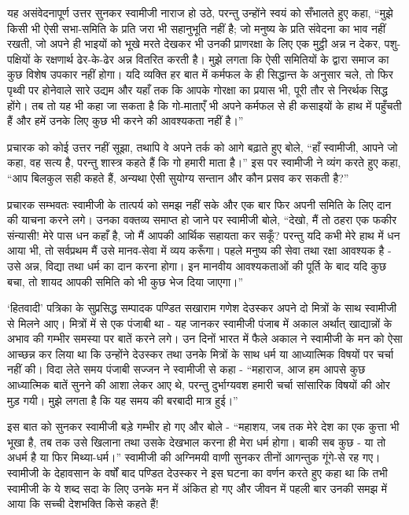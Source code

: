 यह असंवेदनापूर्ण उत्तर सुनकर स्वामीजी नाराज हो उठे, परन्तु उन्होंने स्वयं को सँभालते हुए कहा, “मुझे किसी भी ऐसी सभा-समिति के प्रति जरा भी सहानुभूति नहीं है; जो मनुष्य के प्रति संवेदना का भाव नहीं रखती, जो अपने ही भाइयों को भूखे मरते देखकर भी उनकी प्राणरक्षा के लिए एक मुट्ठी अन्न न देकर, पशु-पक्षियों के रक्षणार्थ ढेर-के-ढेर अन्न वितरित करती है। मुझे लगता कि ऐसी समितियों के द्वारा समाज का कुछ विशेष उपकार नहीं होगा। यदि व्यक्ति हर बात में कर्मफल के ही सिद्धान्त के अनुसार चले, तो फिर पृथ्वी पर होनेवाले सारे उद्यम और यहाँ तक कि आपके गोरक्षा का प्रयास भी, पूरी तौर से निरर्थक सिद्ध होंगे। तब तो यह भी कहा जा सकता है कि गो-माताएँ भी अपने कर्मफल से ही कसाइयों के हाथ में पहुँचती हैं और हमें उनके लिए कुछ भी करने की आवश्यकता नहीं है।” 

प्रचारक को कोई उत्तर नहीं सूझा, तथापि वे अपने तर्क को आगे बढ़ाते हुए बोले, “हाँ स्वामीजी, आपने जो कहा, वह सत्य है, परन्तु शास्त्र कहते हैं कि गो हमारी माता है।” इस पर स्वामीजी ने व्यंग करते हुए कहा, “आप बिलकुल सही कहते हैं, अन्यथा ऐसी सुयोग्य सन्तान और कौन प्रसव कर सकती है?” 

प्रचारक सम्भवतः स्वामीजी के तात्पर्य को समझ नहीं सके और एक बार फिर अपनी समिति के लिए दान की याचना करने लगे। उनका वक्तव्य समाप्त हो जाने पर स्वामीजी बोले, “देखो, मैं तो ठहरा एक फकीर संन्यासी! मेरे पास धन कहाँ है, जो मैं आपकी आर्थिक सहायता कर सकूँ? परन्तु यदि कभी मेरे हाथ में धन आया भी, तो सर्वप्रथम मैं उसे मानव-सेवा में व्यय करूँगा। पहले मनुष्य की सेवा तथा रक्षा आवश्यक है - उसे अन्न, विद्या तथा धर्म का दान करना होगा। इन मानवीय आवश्यकताओं की पूर्ति के बाद यदि कुछ बचा, तो शायद आपकी समिति को भी कुछ भेज दिया जाएगा।” 

\vskip -7pt

\delimiter

‘हितवादी’ पत्रिका के सुप्रसिद्ध सम्पादक पण्डित सखाराम गणेश देउस्कर अपने दो मित्रों के साथ स्वामीजी से मिलने आए। मित्रों में से एक पंजाबी था - यह जानकर स्वामीजी पंजाब में अकाल अर्थात् खाद्यान्नों के अभाव की गम्भीर समस्या पर बातें करने लगे। उन दिनों भारत में फैले अकाल ने स्वामीजी के मन को ऐसा आच्छन्न कर लिया था कि उन्होंने देउस्कर तथा उनके मित्रों के साथ धर्म या आध्यात्मिक विषयों पर चर्चा नहीं की। विदा लेते समय पंजाबी सज्जन ने स्वामीजी से कहा - “महाराज, आज हम आपसे कुछ आध्यात्मिक बातें सुनने की आशा लेकर आए थे, परन्तु दुर्भाग्यवश हमारी चर्चा सांसारिक विषयों की ओर मुड़ गयी। मुझे लगता है कि यह समय की बरबादी मात्र हुई।” 

इस बात को सुनकर स्वामीजी बड़े गम्भीर हो गए और बोले - “महाशय, जब तक मेरे देश का एक कुत्ता भी भूखा है, तब तक उसे खिलाना तथा उसके देखभाल करना ही मेरा धर्म होगा। बाकी सब कुछ - या तो अधर्म है या फिर मिथ्या-धर्म।” स्वामीजी की अग्निमयी वाणी सुनकर तीनों आगन्तुक गूंगे-से रह गए। स्वामीजी के देहावसान के वर्षों बाद पण्डित देउस्कर ने इस घटना का वर्णन करते हुए कहा था कि तभी स्वामीजी के ये शब्द सदा के लिए उनके मन में अंकित हो गए और जीवन में पहली बार उनकी समझ में आया कि सच्ची देशभक्ति किसे कहते हैं! 

